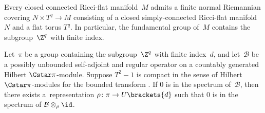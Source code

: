 \documentclass[10pt,a4paper]{amsart}
\numberwithin{equation}{section}
\begin{document}
\begin{thm} \label{ThmStructureTheorem}
 Every closed connected Ricci-flat manifold~$M$ admits a finite normal Riemannian covering $N\times T^q \to M$ consisting of a closed simply-connected Ricci-flat manifold~$N$ and a flat torus $T^q$. In particular, the fundamental group of~$M$ contains the subgroup~$\Z^q$ with finite index.
\end{thm}

\begin{prop} \label{PropDetectionPrinciple}
Let~$\pi$ be a group containing the subgroup~$\Z^q$ with finite index~$d$, and let~$\mathcal{B}$ be a possibly unbounded self-adjoint and regular operator on a countably generated Hilbert $\Cstar \pi$-module. Suppose $T^2-1$ is compact in the sense of Hilbert $\Cstar \pi$-modules for the bounded transform . If $0$ is in the spectrum of~$\mathcal{B}$, then there exists a~representation $\rho\colon \pi \to U\brackets{d}$ such that $0$ is in the spectrum of $\mathcal{B}\otimes_{\rho} \id$.
\end{prop}
\end{document}
